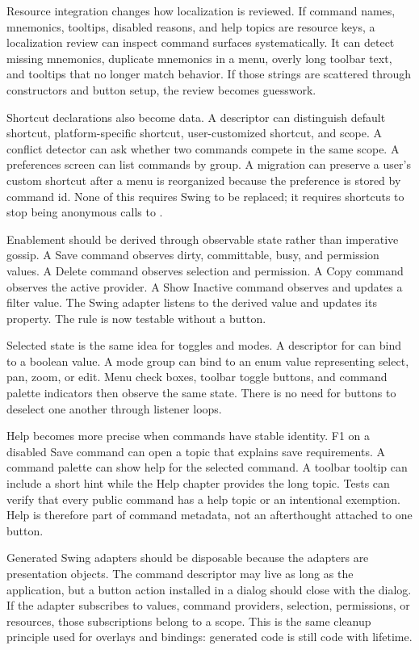 Resource integration changes how localization is reviewed. If command names,
mnemonics, tooltips, disabled reasons, and help topics are resource keys, a
localization review can inspect command surfaces systematically. It can detect
missing mnemonics, duplicate mnemonics in a menu, overly long toolbar text, and
tooltips that no longer match behavior. If those strings are scattered through
constructors and button setup, the review becomes guesswork.

Shortcut declarations also become data. A descriptor can distinguish default
shortcut, platform-specific shortcut, user-customized shortcut, and scope. A
conflict detector can ask whether two commands compete in the same scope. A
preferences screen can list commands by group. A migration can preserve a
user's custom shortcut after a menu is reorganized because the preference is
stored by command id. None of this requires Swing to be replaced; it requires
shortcuts to stop being anonymous calls to .

Enablement should be derived through observable state rather than imperative
 gossip. A Save command observes dirty, committable, busy, and
permission values. A Delete command observes selection and permission. A Copy
command observes the active provider. A Show Inactive command observes and
updates a filter value. The Swing  adapter listens to the derived
value and updates its property. The rule is now testable without a button.

Selected state is the same idea for toggles and modes. A descriptor for
 can bind to a boolean value. A mode group can bind to an
enum value representing select, pan, zoom, or edit. Menu check boxes, toolbar
toggle buttons, and command palette indicators then observe the same state.
There is no need for buttons to deselect one another through listener loops.

Help becomes more precise when commands have stable identity. F1 on a disabled
Save command can open a topic that explains save requirements. A command
palette can show help for the selected command. A toolbar tooltip can include a
short hint while the Help chapter provides the long topic. Tests can verify
that every public command has a help topic or an intentional exemption. Help is
therefore part of command metadata, not an afterthought attached to one button.

Generated Swing adapters should be disposable because the adapters are
presentation objects. The command descriptor may live as long as the
application, but a button action installed in a dialog should close with the
dialog. If the adapter subscribes to values, command providers, selection,
permissions, or resources, those subscriptions belong to a scope. This is the
same cleanup principle used for overlays and bindings: generated code is still
code with lifetime.

